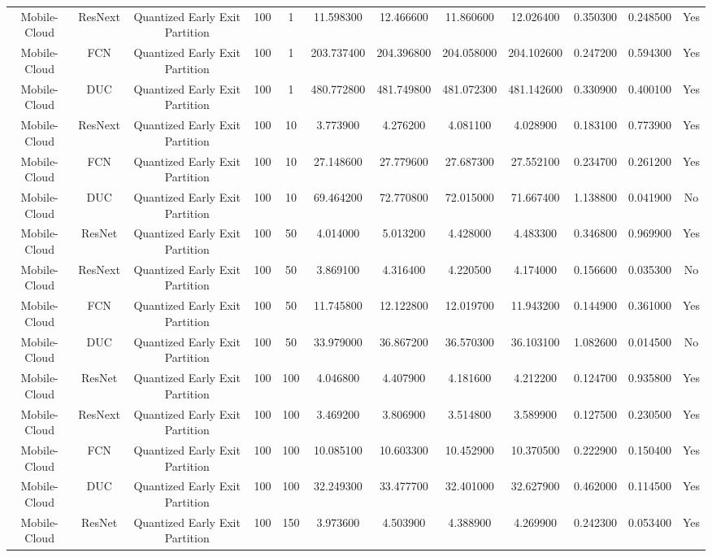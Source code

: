 \begin{tabular}{|c||c||c||c||c||c||c||c||c||c||c||c|}
Mobile-Cloud & ResNext & Quantized Early Exit Partition & 100 & 1 & 11.598300 & 12.466600 & 11.860600 & 12.026400 & 0.350300 & 0.248500 & Yes \\
Mobile-Cloud & FCN & Quantized Early Exit Partition & 100 & 1 & 203.737400 & 204.396800 & 204.058000 & 204.102600 & 0.247200 & 0.594300 & Yes \\
Mobile-Cloud & DUC & Quantized Early Exit Partition & 100 & 1 & 480.772800 & 481.749800 & 481.072300 & 481.142600 & 0.330900 & 0.400100 & Yes \\
Mobile-Cloud & ResNext & Quantized Early Exit Partition & 100 & 10 & 3.773900 & 4.276200 & 4.081100 & 4.028900 & 0.183100 & 0.773900 & Yes \\
Mobile-Cloud & FCN & Quantized Early Exit Partition & 100 & 10 & 27.148600 & 27.779600 & 27.687300 & 27.552100 & 0.234700 & 0.261200 & Yes \\
Mobile-Cloud & DUC & Quantized Early Exit Partition & 100 & 10 & 69.464200 & 72.770800 & 72.015000 & 71.667400 & 1.138800 & 0.041900 & No \\
Mobile-Cloud & ResNet & Quantized Early Exit Partition & 100 & 50 & 4.014000 & 5.013200 & 4.428000 & 4.483300 & 0.346800 & 0.969900 & Yes \\
Mobile-Cloud & ResNext & Quantized Early Exit Partition & 100 & 50 & 3.869100 & 4.316400 & 4.220500 & 4.174000 & 0.156600 & 0.035300 & No \\
Mobile-Cloud & FCN & Quantized Early Exit Partition & 100 & 50 & 11.745800 & 12.122800 & 12.019700 & 11.943200 & 0.144900 & 0.361000 & Yes \\
Mobile-Cloud & DUC & Quantized Early Exit Partition & 100 & 50 & 33.979000 & 36.867200 & 36.570300 & 36.103100 & 1.082600 & 0.014500 & No \\
Mobile-Cloud & ResNet & Quantized Early Exit Partition & 100 & 100 & 4.046800 & 4.407900 & 4.181600 & 4.212200 & 0.124700 & 0.935800 & Yes \\
Mobile-Cloud & ResNext & Quantized Early Exit Partition & 100 & 100 & 3.469200 & 3.806900 & 3.514800 & 3.589900 & 0.127500 & 0.230500 & Yes \\
Mobile-Cloud & FCN & Quantized Early Exit Partition & 100 & 100 & 10.085100 & 10.603300 & 10.452900 & 10.370500 & 0.222900 & 0.150400 & Yes \\
Mobile-Cloud & DUC & Quantized Early Exit Partition & 100 & 100 & 32.249300 & 33.477700 & 32.401000 & 32.627900 & 0.462000 & 0.114500 & Yes \\
Mobile-Cloud & ResNet & Quantized Early Exit Partition & 100 & 150 & 3.973600 & 4.503900 & 4.388900 & 4.269900 & 0.242300 & 0.053400 & Yes \\

\end{tabular}

